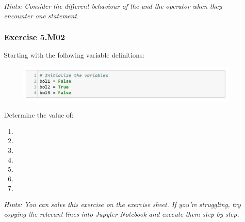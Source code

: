 \textit{
Hints:
Consider the different behaviour of the {} and the {} operator when they encounter one {} statement.}\\[1cm]



\subsubsection*{Exercise 5.M02}
Starting with the following variable definitions:
\begin{figure}[H]
		\centering
		\includegraphics[width=\textwidth]{../IMG/5M02.png} 
\end{figure}
Determine the value of:
\begin{enumerate}[label=(\alph*)]
	\item {}
	\item {}
	\item {}
	\item {}
	\item {}
	\item {}
	\item {}
\end{enumerate}


\textit{Hints:
You can solve this exercise on the exercise sheet. If you’re struggling, try copying the relevant lines into Jupyter Notebook and execute them step by step.}\\[1cm]



